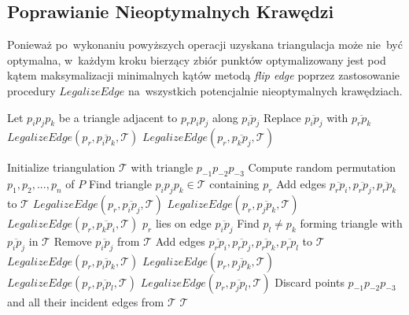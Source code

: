 \documentclass[skorowidz,autorrok,backref,xodstep,oswiadczenie]{wmimgr}
\begin{document}
\subsection{Poprawianie Nieoptymalnych Krawędzi}

Ponieważ po~wykonaniu powyższych operacji uzyskana triangulacja może nie~być optymalna, w~każdym kroku bierzący zbiór punktów optymalizowany jest pod kątem maksymalizacji minimalnych kątów metodą \emph{flip edge} poprzez zastosowanie procedury $LegalizeEdge$ na~wszystkich potencjalnie nieoptymalnych krawędziach.

\begin{algorithm}
\caption{$LegalizeEdge(p_{r}, \overline{p_{i} p_{j}}, \mathcal{T})$ \cite{geometria}}
\label{LegalizeEdge}
\begin{algorithmic}
        \STATE Let $p_{i} p_{j} p_{k}$ be a triangle adjacent to $p_{r} p_{i} p_{j}$ along $\overline{p_{i} p_{j}}$
        \STATE Replace $\overline{p_{i} p_{j}}$ with $\overline{p_{r} p_{k}}$
        \STATE $LegalizeEdge(p_{r}, \overline{p_{i} p_{k}}, \mathcal{T})$
        \STATE $LegalizeEdge(p_{r}, \overline{p_{k} p_{j}}, \mathcal{T})$
    \ENDIF
\end{algorithmic}
\end{algorithm}

\begin{algorithm}
\caption{$DelaunayTriangulation(P)$ \cite{geometria}}
\label{DelaunayTriangulation}
\begin{algorithmic}
    \STATE Initialize triangulation $\mathcal{T}$ with triangle $p_{-1} p_{-2} p_{-3}$
    \STATE Compute random permutation $p_{1}, p_{2}, ..., p_{n}$ of $P$
        \STATE Find triangle $p_{i} p_{j} p_{k} \in \mathcal{T}$ containing $p_{r}$
            \STATE Add edges $\overline{p_{r} p_{i}}, \overline{p_{r} p_{j}}, \overline{p_{r} p_{k}}$ to $\mathcal{T}$
            \STATE $LegalizeEdge(p_{r}, \overline{p_{i} p_{j}}, \mathcal{T})$
            \STATE $LegalizeEdge(p_{r}, \overline{p_{j} p_{k}}, \mathcal{T})$
            \STATE $LegalizeEdge(p_{r}, \overline{p_{k} p_{i}}, \mathcal{T})$
        \ELSE
            \STATE $p_{r}$ lies on edge $\overline{p_{i} p_{j}}$
            \STATE Find $p_{l} \neq p_{k}$ forming triangle with $\overline{p_{i} p_{j}}$ in $\mathcal{T}$
            \STATE Remove $\overline{p_{i} p_{j}}$ from $\mathcal{T}$
            \STATE Add edges $\overline{p_{r} p_{i}}, \overline{p_{r} p_{j}}, \overline{p_{r} p_{k}}, \overline{p_{r} p_{l}}$ to $\mathcal{T}$
            \STATE $LegalizeEdge(p_{r}, \overline{p_{i} p_{k}}, \mathcal{T})$
            \STATE $LegalizeEdge(p_{r}, \overline{p_{j} p_{k}}, \mathcal{T})$
            \STATE $LegalizeEdge(p_{r}, \overline{p_{i} p_{l}}, \mathcal{T})$
            \STATE $LegalizeEdge(p_{r}, \overline{p_{j} p_{l}}, \mathcal{T})$
        \ENDIF
    \ENDFOR
    \STATE Discard points $p_{-1} p_{-2} p_{-3}$ and all their incident edges from $\mathcal{T}$
    \RETURN $\mathcal{T}$
\end{algorithmic}
\end{algorithm}
\end{document}
